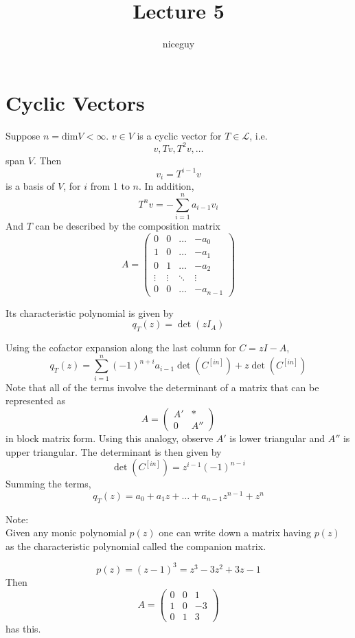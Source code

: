 \documentclass[12pt]{article}
\author{niceguy}
\title{Lecture 5}
\begin{document}
\maketitle

\section{Cyclic Vectors}

Suppose $n=\mathrm{dim}V<\infty$. $v\in V$ is a cyclic vector for $T\in\mathcal L$, i.e.
$$v,Tv,T^2v,\dots$$
span $V$. Then
$$v_i = T^{i-1}v$$
is a basis of $V$, for $i$ from 1 to $n$. In addition,
$$T^nv = -\sum_{i=1}^n a_{i-1}v_i$$
And $T$ can be described by the composition matrix
$$A = \begin{pmatrix} 0 & 0 & \dots & -a_0 \\ 1 & 0 & \dots & -a_1 \\ 0 & 1 & \dots & -a_2 \\ \vdots & \vdots & \ddots & \vdots \\ 0 & 0 & \dots & -a_{n-1}\end{pmatrix}$$

Its characteristic polynomial is given by
$$q_T(z) = \det(zI_A)$$

Using the cofactor expansion along the last column for $C=zI-A$,
$$q_T(z) = \sum_{i=1}^n (-1)^{n+i} a_{i-1}\det(C^{[in]}) + z\det(C^{[in]})$$
Note that all of the terms involve the determinant of a matrix that can be represented as
$$A = \begin{pmatrix} A' & * \\ 0 & A''\end{pmatrix}$$
in block matrix form. Using this analogy, observe $A'$ is lower triangular and $A''$ is upper triangular. The determinant is then given by
$$\det(C^{[in]}) = z^{i-1}(-1)^{n-i}$$
Summing the terms,
$$q_T(z) = a_0 + a_1z +\dots+a_{n-1}z^{n-1} + z^n$$

Note: \\
Given any monic polynomial $p(z)$ one can write down a matrix having $p(z)$ as the characteristic polynomial called the companion matrix.

\begin{ex}
	$$p(z) = (z-1)^3 = z^3 -3z^2 + 3z - 1$$
	Then
	$$A = \begin{pmatrix} 0 & 0 & 1 \\ 1 & 0 & -3 \\ 0 & 1 & 3\end{pmatrix}$$
	has this.
\end{ex}
\end{document}
